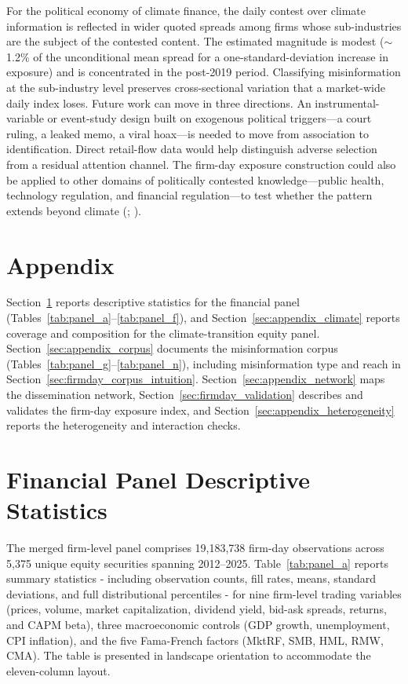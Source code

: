 \documentclass{article}
\theoremstyle{plain}
\begin{document}
For the political economy of climate finance, the daily contest over climate information is reflected in wider quoted spreads among firms whose sub-industries are the subject of the contested content. The estimated magnitude is modest ($\sim$1.2\% of the unconditional mean spread for a one-standard-deviation increase in exposure) and is concentrated in the post-2019 period. Classifying misinformation at the sub-industry level preserves cross-sectional variation that a market-wide daily index loses. Future work can move in three directions. An instrumental-variable or event-study design built on exogenous political triggers---a court ruling, a leaked memo, a viral hoax---is needed to move from association to identification. Direct retail-flow data would help distinguish adverse selection from a residual attention channel. The firm-day exposure construction could also be applied to other domains of politically contested knowledge---public health, technology regulation, and financial regulation---to test whether the pattern extends beyond climate (\cite{lins2017social}; \cite{taber2006motivated}).

\printbibliography

\appendix
\section*{Appendix} 
Section~\ref{sec:appendix_financial} reports descriptive statistics for the financial panel (Tables~\ref{tab:panel_a}--\ref{tab:panel_f}), and Section~\ref{sec:appendix_climate} reports coverage and composition for the climate-transition equity panel. Section~\ref{sec:appendix_corpus} documents the misinformation corpus (Tables~\ref{tab:panel_g}--\ref{tab:panel_n}), including misinformation type and reach in Section~\ref{sec:firmday_corpus_intuition}. Section~\ref{sec:appendix_network} maps the dissemination network, Section~\ref{sec:firmday_validation} describes and validates the firm-day exposure index, and Section~\ref{sec:appendix_heterogeneity} reports the heterogeneity and interaction checks.

\section{Financial Panel Descriptive Statistics}
\label{sec:appendix_financial}

The merged firm-level panel comprises 19,183,738 firm-day observations across 5,375 unique equity securities spanning 2012--2025. Table~\ref{tab:panel_a} reports summary statistics - including observation counts, fill rates, means, standard deviations, and full distributional percentiles - for nine firm-level trading variables (prices, volume, market capitalization, dividend yield, bid-ask spreads, returns, and CAPM beta), three macroeconomic controls (GDP growth, unemployment, CPI inflation), and the five Fama-French factors (MktRF, SMB, HML, RMW, CMA). The table is presented in landscape orientation to accommodate the eleven-column layout.
\end{document}
